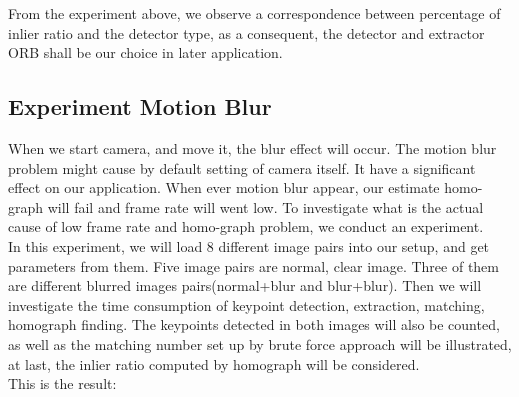 \documentclass[10pt,conference,compsocconf]{IEEEtran}
\begin{document}
From the experiment above, we observe a correspondence between percentage of inlier ratio and the detector type, as a consequent, the detector and extractor ORB shall be our choice in later application.\\

\subsection{Experiment Motion Blur}

When we start camera, and move it, the blur effect will occur. The motion blur problem might cause by default setting of camera itself. It have a significant effect on our application. When ever motion blur appear, our estimate homo-graph will fail and frame rate will went low. To investigate what is the actual cause of low frame rate and homo-graph problem, we conduct an experiment.\\

In this experiment, we will load 8 different image pairs into our setup, and get parameters from them.
Five image pairs are normal, clear image. Three of them are different blurred images pairs(normal+blur and blur+blur). Then we will investigate the time consumption of keypoint detection, extraction, matching, homograph finding. The keypoints detected in both images will also be counted, as well as the matching number set up by brute force approach will be illustrated, at last, the inlier ratio computed by homograph will be considered.\\

This is the result:\\
\end{document}
